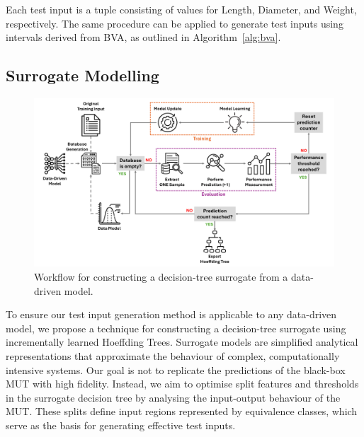 \documentclass[
]{ceurart}
\theoremstyle{definition}
\begin{document}
Each test input is a tuple consisting of values for Length, Diameter, and Weight, respectively. The same procedure can be applied to generate test inputs using intervals derived from BVA, as outlined in Algorithm~\ref{alg:bva}.

\subsection{Surrogate Modelling}
\label{sec:surrogate}

\begin{figure}
\centering
\includegraphics[width=\linewidth]{img/surrogate}
\caption{Workflow for constructing a decision-tree surrogate from a data-driven model.}
\label{fig:surrogate}
\end{figure}

To ensure our test input generation method is applicable to any data-driven model, we propose a technique for constructing a decision-tree surrogate using incrementally learned Hoeffding Trees. Surrogate models are simplified analytical representations that approximate the behaviour of complex, computationally intensive systems. Our goal is not to replicate the predictions of the black-box MUT with high fidelity. Instead, we aim to optimise split features and thresholds in the surrogate decision tree by analysing the input-output behaviour of the MUT. These splits define input regions represented by equivalence classes, which serve as the basis for generating effective test inputs.
\end{document}
